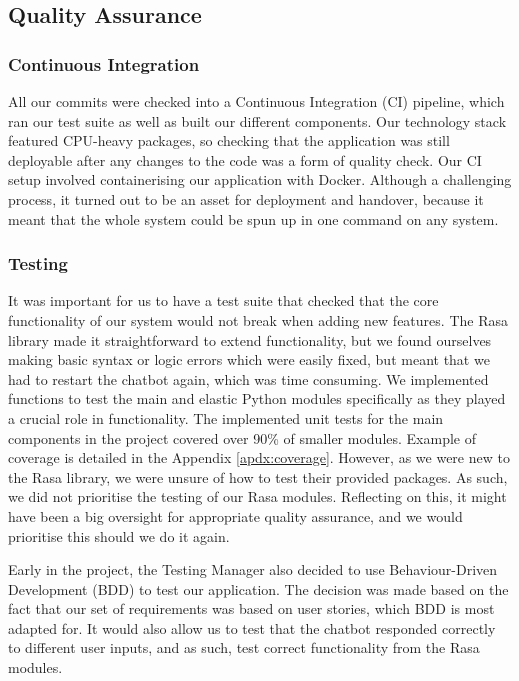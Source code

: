 \documentclass{l3proj}
\begin{document}
\subsection{Quality Assurance}

\subsubsection{Continuous Integration}
\label{subsubsec:ci}

All our commits were checked into a Continuous Integration (CI) pipeline, which ran our test suite as well as built our different components. Our technology stack featured CPU-heavy packages, so checking that the application was still deployable after any changes to the code was a form of quality check. Our CI setup involved containerising our application with Docker. Although a challenging process, it turned out to be an asset for deployment and handover, because it meant that the whole system could be spun up in one command on any system.

\subsubsection{Testing}

It was important for us to have a test suite that checked that the core functionality of our system would not break when adding new features. The Rasa library made it straightforward to extend functionality, but we found ourselves making basic syntax or logic errors which were easily fixed, but meant that we had to restart the chatbot again, which was time consuming. We implemented functions to test the main and elastic Python modules specifically as they played a crucial role in functionality. The implemented unit tests for the main components in the project covered over 90\% of smaller modules. Example of coverage is detailed in the Appendix \ref{apdx:coverage}. However, as we were new to the Rasa library, we were unsure of how to test their provided packages. As such, we did not prioritise the testing of our Rasa modules. Reflecting on this, it might have been a big oversight for appropriate quality assurance, and we would prioritise this should we do it again.

Early in the project, the Testing Manager also decided to use Behaviour-Driven Development (BDD) to test our application. The decision was made based on the fact that our set of requirements was based on user stories, which BDD is most adapted for\cite{bdd:Goulart}. It would also allow us to test that the chatbot responded correctly to different user inputs, and as such, test correct functionality from the Rasa modules.
\end{document}
